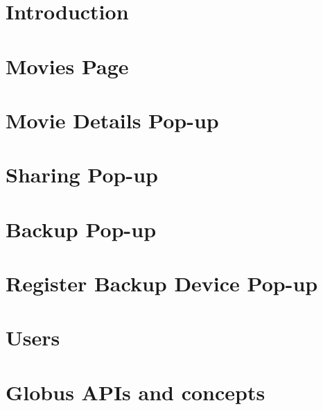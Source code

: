 \documentclass{report}
\begin{document}
\maketitle
\tableofcontents

\chapter{Introduction}


\chapter{Movies Page}


%

\chapter{Movie Details Pop-up}


\chapter{Sharing Pop-up}


\chapter{Backup Pop-up}


\chapter{Register Backup Device Pop-up\label{chapter:registerbackupdevice}}


\chapter{Users}


\appendix

\chapter{Globus APIs and concepts}

\end{document}
